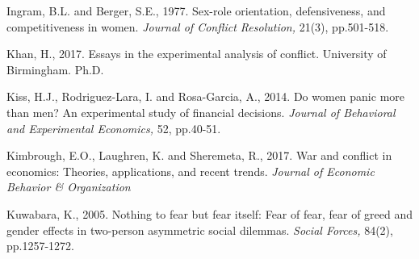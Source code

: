 \documentclass[12pt, letterpaper]{article}
\theoremstyle{plain}
\begin{document}
\begin{thebibliography}{10}



\bibitem{} Ingram, B.L. and Berger, S.E., 1977. Sex-role orientation, defensiveness, and competitiveness in women. \textit{Journal of Conflict Resolution,} 21(3), pp.501-518.


\bibitem{} Khan, H., 2017. Essays in the experimental analysis of conflict. University of Birmingham. Ph.D.

\bibitem{} Kiss, H.J., Rodriguez-Lara, I. and Rosa-Garcia, A., 2014. Do women panic more than men? An experimental study of financial decisions. \textit{Journal of Behavioral and Experimental Economics,} 52, pp.40-51.


\bibitem{} Kimbrough, E.O., Laughren, K. and Sheremeta, R., 2017. War and conflict in economics: Theories, applications, and recent trends. \textit{Journal of Economic Behavior \& Organization}

\bibitem{} Kuwabara, K., 2005. Nothing to fear but fear itself: Fear of fear, fear of greed and gender effects in two-person asymmetric social dilemmas. \textit{Social Forces,} 84(2), pp.1257-1272.






\end{thebibliography}
\end{document}
